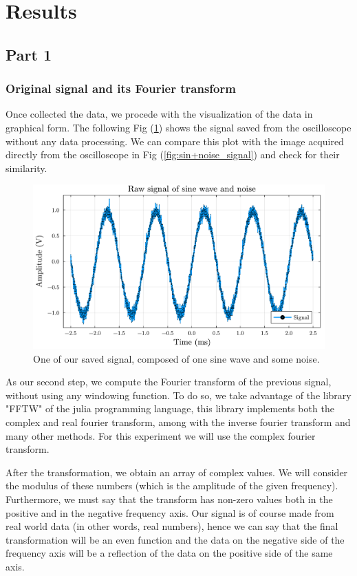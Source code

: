 \documentclass[a4paper,12pt]{article}
\begin{document}
\section{Results}
\subsection{Part 1}
\subsubsection{Original signal and its Fourier transform}
\par Once collected the data, we procede with the visualization of the data 
in graphical form. The following Fig (\ref{plot:raw_signal_and_noise}) 
shows the signal saved from the oscilloscope without any data processing. 
We can compare this plot with the image acquired directly from the oscilloscope
in Fig (\ref{fig:sin+noise_signal}) and check for their similarity.
\begin{figure}[H]
    \centering
    \includegraphics[width=1\textwidth]{signal01.pdf}
    \caption{One of our saved signal, composed of one sine wave and some noise.}
    \label{plot:raw_signal_and_noise}
\end{figure}

\par As our second step, we compute the Fourier transform of the previous signal, 
without using any windowing function. To do so, we take advantage of the library
"FFTW" of the julia programming language, this library implements both the
complex and real fourier transform, among with the inverse fourier transform 
and many other methods. For this experiment we will use the complex fourier transform.

\par After the transformation, we obtain an array of complex values. We will consider the
modulus of these numbers (which is the amplitude of the given frequency). Furthermore, 
we must say that the transform has non-zero values both in the positive and in the 
negative frequency axis. Our signal is of course made from real world data 
(in other words, real numbers), hence we can say that the final transformation will 
be an even function and the data on the negative side of the frequency axis will be 
a reflection of the data on the positive side of the same axis.
\end{document}
